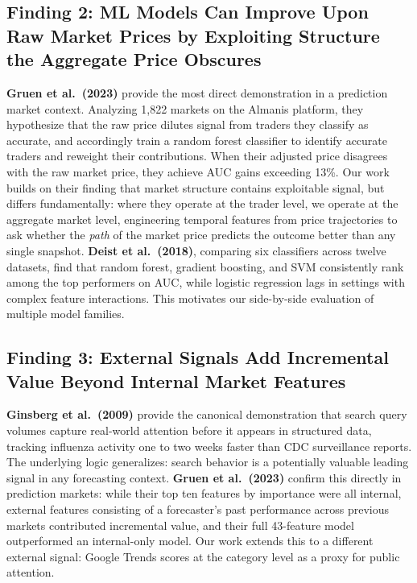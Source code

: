 \documentclass[11pt,twocolumn]{article}
\begin{document}
\subsection*{Finding 2: ML Models Can Improve Upon Raw Market Prices by Exploiting Structure the Aggregate Price Obscures}

\textbf{Gruen et al.\ (2023)} provide the most direct demonstration in a prediction market context. Analyzing 1,822 markets on the Almanis platform, they hypothesize that the raw price dilutes signal from traders they classify as accurate, and accordingly train a random forest classifier to identify accurate traders and reweight their contributions. When their adjusted price disagrees with the raw market price, they achieve AUC gains exceeding 13\%. Our work builds on their finding that market structure contains exploitable signal, but differs fundamentally: where they operate at the trader level, we operate at the aggregate market level, engineering temporal features from price trajectories to ask whether the \emph{path} of the market price predicts the outcome better than any single snapshot. \textbf{Deist et al.\ (2018)}, comparing six classifiers across twelve datasets, find that random forest, gradient boosting, and SVM consistently rank among the top performers on AUC, while logistic regression lags in settings with complex feature interactions. This motivates our side-by-side evaluation of multiple model families.

\subsection*{Finding 3: External Signals Add Incremental Value Beyond Internal Market Features}

\textbf{Ginsberg et al.\ (2009)} provide the canonical demonstration that search query volumes capture real-world attention before it appears in structured data, tracking influenza activity one to two weeks faster than CDC surveillance reports. The underlying logic generalizes: search behavior is a potentially valuable leading signal in any forecasting context. \textbf{Gruen et al.\ (2023)} confirm this directly in prediction markets: while their top ten features by importance were all internal, external features consisting of a forecaster's past performance across previous markets contributed incremental value, and their full 43-feature model outperformed an internal-only model. Our work extends this to a different external signal: Google Trends scores at the category level as a proxy for public attention.
\end{document}

